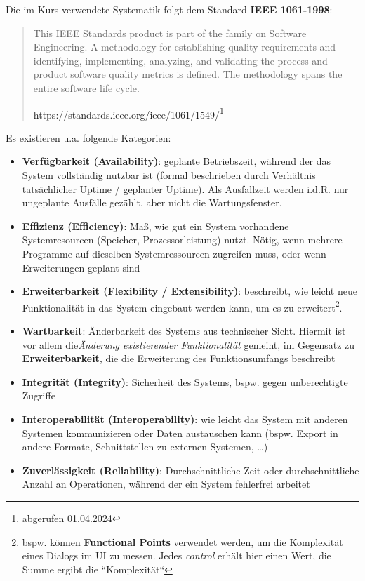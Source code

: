 \noindent
Die im Kurs verwendete Systematik folgt dem Standard \textbf{IEEE 1061-1998}:

\blockquote[{\url{https://standards.ieee.org/ieee/1061/1549/}\footnote{abgerufen 01.04.2024}}]{
    This IEEE Standards product is part of the family on Software Engineering. A methodology for establishing quality requirements and identifying, implementing, analyzing, and validating the process and product software quality metrics is defined. The methodology spans the entire software life cycle.
}

\noindent
Es existieren u.a. folgende Kategorien:

\begin{itemize}
    \item \textbf{Verfügbarkeit (Availability)}: geplante Betriebszeit, während der das System vollständig nutzbar ist (formal beschrieben durch Verhältnis tatsächlicher Uptime / geplanter Uptime).
    Als Ausfallzeit werden i.d.R. nur ungeplante Ausfälle gezählt, aber nicht die Wartungsfenster.
    \item \textbf{Effizienz (Efficiency)}: Maß, wie gut ein System vorhandene Systemresourcen (Speicher, Prozessorleistung) nutzt.
    Nötig, wenn mehrere Programme auf dieselben Systemressourcen zugreifen muss, oder wenn Erweiterungen geplant sind
    \item \textbf{Erweiterbarkeit (Flexibility / Extensibility)}: beschreibt, wie leicht neue Funktionalität in das System eingebaut werden kann, um es zu erweitert\footnote{
        bspw. können \textbf{Functional Points} verwendet werden, um die Komplexität eines Dialogs im UI zu messen. Jedes \textit{control} erhält hier einen Wert, die Summe ergibt die ``Komplexität``
    }.
    \item \textbf{Wartbarkeit}: Änderbarkeit des Systems aus technischer Sicht.
    Hiermit ist vor allem die\textit{Änderung existierender Funktionalität} gemeint, im Gegensatz zu \textbf{Erweiterbarkeit}, die die Erweiterung des Funktionsumfangs beschreibt
    \item \textbf{Integrität (Integrity)}: Sicherheit des Systems, bspw. gegen unberechtigte Zugriffe
    \item \textbf{Interoperabilität (Interoperability)}: wie leicht das System mit anderen Systemen kommunizieren oder Daten austauschen kann (bspw. Export in andere Formate, Schnittstellen zu externen Systemen, \ldots)
    \item \textbf{Zuverlässigkeit (Reliability)}: Durchschnittliche Zeit oder durchschnittliche Anzahl an Operationen, während der ein System fehlerfrei arbeitet

\end{itemize}
